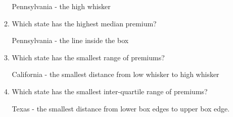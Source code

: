 \documentclass{article}
\newcommand{\answer}[1]{\color{white}#1}
\begin{document}
\begin{enumerate}
\begin{enumerate}
	{\answer{Pennsylvania - the high whisker}} 
	
	\item Which state has the highest median premium?
	
	{\answer{Pennsylvania - the line inside the box}} 
	
	\item Which state has the smallest range of premiums?
	
	{\answer{California - the smallest distance from low whisker to high whisker}} 
	
	\item Which state has the smallest inter-quartile range of premiums?
	
	{\answer{Texas - the smallest distance from lower box edges to upper box edge.}} 
	
	\end{enumerate}

\end{enumerate}	
\end{document}
